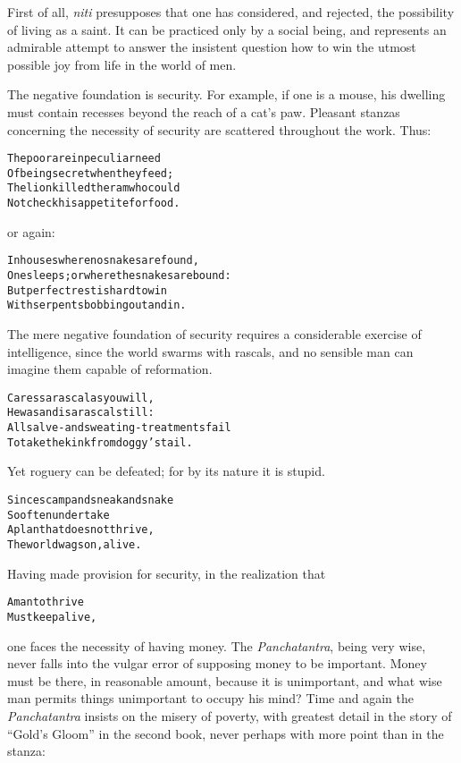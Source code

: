 \documentclass{article}
\renewenvironment{verbatim}{\begin{alltt}\normalfont\begin{centering}}{\end{centering}\end{alltt}}
\begin{document}
First of all, \emph{niti} presupposes that one has considered, and
rejected, the possibility of living as a saint. It can be practiced
only by a social being, and represents an admirable attempt to
answer the insistent question how to win the utmost possible joy
from life in the world of men.

The negative foundation is security. For example, if one is a
mouse, his dwelling must contain recesses beyond the reach of a
cat's paw. Pleasant stanzas concerning the necessity of security
are scattered throughout the work. Thus:

\begin{verbatim}
The poor are in peculiar need
Of being secret when they feed;
The lion killed the ram who could
Not check his appetite for food.
\end{verbatim}
or again:

\begin{verbatim}
In houses where no snakes are found,
One sleeps; or where the snakes are bound:
But perfect rest is hard to win
With serpents bobbing out and in.
\end{verbatim}
The mere negative foundation of security requires a considerable
exercise of intelligence, since the world swarms with rascals, and
no sensible man can imagine them capable of reformation.

\begin{verbatim}
Caress a rascal as you will,
He was and is a rascal still:
All salve- and sweating-treatments fail
To take the kink from doggy's tail.
\end{verbatim}
Yet roguery can be defeated; for by its nature it is stupid.

\begin{verbatim}
Since scamp and sneak and snake
So often undertake
A plan that does not thrive,
The world wags on, alive.
\end{verbatim}
Having made provision for security, in the realization that

\begin{verbatim}
A man to thrive
Must keep alive,
\end{verbatim}
one faces the necessity of having money. The \emph{Panchatantra},
being very wise, never falls into the vulgar error of supposing
money to be important. Money must be there, in reasonable amount,
because it is unimportant, and what wise man permits things
unimportant to occupy his mind? Time and again the
\emph{Panchatantra} insists on the misery of poverty, with greatest
detail in the story of ``Gold's Gloom'' in the second book, never
perhaps with more point than in the stanza:
\end{document}
